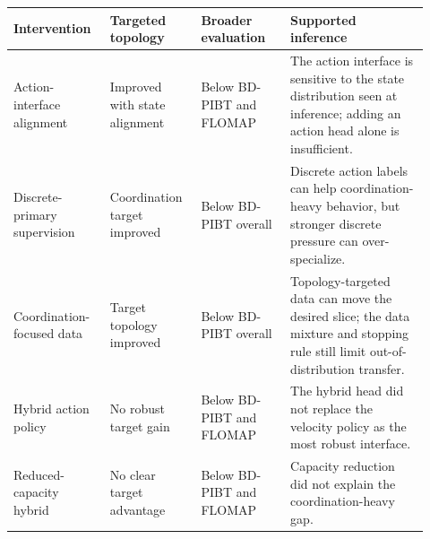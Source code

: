 \scriptsize
\setlength{\tabcolsep}{4pt}
\begin{tabular}{p{0.21\linewidth}p{0.20\linewidth}p{0.20\linewidth}p{0.31\linewidth}}
\toprule
Intervention & Targeted topology & Broader evaluation & Supported inference \\
\midrule
Action-interface alignment & Improved with state alignment & Below BD-PIBT and FLOMAP & The action interface is sensitive to the state distribution seen at inference; adding an action head alone is insufficient. \\
Discrete-primary supervision & Coordination target improved & Below BD-PIBT overall & Discrete action labels can help coordination-heavy behavior, but stronger discrete pressure can over-specialize. \\
Coordination-focused data & Target topology improved & Below BD-PIBT overall & Topology-targeted data can move the desired slice; the data mixture and stopping rule still limit out-of-distribution transfer. \\
Hybrid action policy & No robust target gain & Below BD-PIBT and FLOMAP & The hybrid head did not replace the velocity policy as the most robust interface. \\
Reduced-capacity hybrid & No clear target advantage & Below BD-PIBT and FLOMAP & Capacity reduction did not explain the coordination-heavy gap. \\
\bottomrule
\end{tabular}
